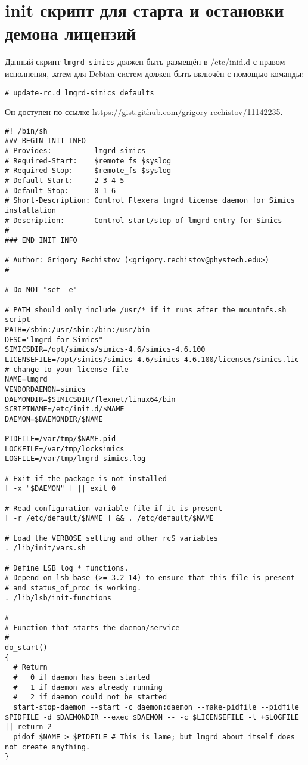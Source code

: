 \clearpage
\section{init скрипт для старта и остановки демона лицензий}\label{sec:initscript}
Данный скрипт \texttt{lmgrd-simics} должен быть размещён в /etc/inid.d с правом исполнения, затем для Debian-систем должен быть включён с помощью команды:

\texttt{\# update-rc.d lmgrd-simics defaults}

Он доступен по ссылке \url{https://gist.github.com/grigory-rechistov/11142235}.

\begin{lstlisting}
#! /bin/sh
### BEGIN INIT INFO
# Provides:          lmgrd-simics
# Required-Start:    $remote_fs $syslog
# Required-Stop:     $remote_fs $syslog
# Default-Start:     2 3 4 5
# Default-Stop:      0 1 6
# Short-Description: Control Flexera lmgrd license daemon for Simics installation
# Description:       Control start/stop of lmgrd entry for Simics
#
### END INIT INFO

# Author: Grigory Rechistov (<grigory.rechistov@phystech.edu>)
#

# Do NOT "set -e"

# PATH should only include /usr/* if it runs after the mountnfs.sh script
PATH=/sbin:/usr/sbin:/bin:/usr/bin
DESC="lmgrd for Simics"
SIMICSDIR=/opt/simics/simics-4.6/simics-4.6.100
LICENSEFILE=/opt/simics/simics-4.6/simics-4.6.100/licenses/simics.lic # change to your license file
NAME=lmgrd
VENDORDAEMON=simics
DAEMONDIR=$SIMICSDIR/flexnet/linux64/bin
SCRIPTNAME=/etc/init.d/$NAME
DAEMON=$DAEMONDIR/$NAME

PIDFILE=/var/tmp/$NAME.pid
LOCKFILE=/var/tmp/locksimics
LOGFILE=/var/tmp/lmgrd-simics.log

# Exit if the package is not installed
[ -x "$DAEMON" ] || exit 0

# Read configuration variable file if it is present
[ -r /etc/default/$NAME ] && . /etc/default/$NAME

# Load the VERBOSE setting and other rcS variables
. /lib/init/vars.sh

# Define LSB log_* functions.
# Depend on lsb-base (>= 3.2-14) to ensure that this file is present
# and status_of_proc is working.
. /lib/lsb/init-functions

#
# Function that starts the daemon/service
#
do_start()
{
  # Return
  #   0 if daemon has been started
  #   1 if daemon was already running
  #   2 if daemon could not be started
  start-stop-daemon --start -c daemon:daemon --make-pidfile --pidfile $PIDFILE -d $DAEMONDIR --exec $DAEMON -- -c $LICENSEFILE -l +$LOGFILE || return 2
  pidof $NAME > $PIDFILE # This is lame; but lmgrd about itself does not create anything.
}


\end{lstlisting}
